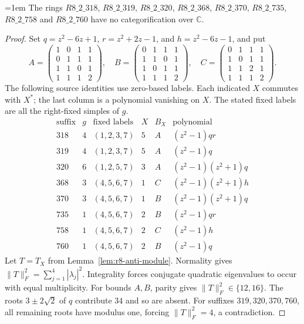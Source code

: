 \begin{proposition}\label{prop:r8-anti-eight}
\emergencystretch=1em
The rings $R8\_2\_318$, $R8\_2\_319$, $R8\_2\_320$,
$R8\_2\_368$, $R8\_2\_370$, $R8\_2\_735$,
$R8\_2\_758$ and $R8\_2\_760$ have no categorification over $\mathbb C$.
\end{proposition}
\begin{proof}
Set $q=z^2-6z+1$, $r=z^2+2z-1$, and $h=z^2-6z-1$, and put
\[
 A=\begin{pmatrix}1&0&1&1\\0&1&1&1\\1&1&0&1\\1&1&1&2\end{pmatrix},\quad
 B=\begin{pmatrix}0&1&1&1\\1&1&0&1\\1&0&1&1\\1&1&1&2\end{pmatrix},\quad
 C=\begin{pmatrix}0&1&1&1\\1&0&1&1\\1&1&2&1\\1&1&1&2\end{pmatrix}.
\]
The following source identities use zero-based labels. Each indicated
$X$ commutes with $X^*$; the last column is a polynomial vanishing on
$X$. The stated fixed labels are all the right-fixed simples of $g$.
\[
\begin{array}{c|c|c|c|c|c}
\text{suffix}&g&\text{fixed labels}&X&B_X&\text{polynomial}\\\hline
318&4&(1,2,3,7)&5&A&(z^2-1)qr\\
319&4&(1,2,3,7)&5&A&(z^2-1)q\\
320&6&(1,2,5,7)&3&A&(z^2-1)(z^2+1)q\\
368&3&(4,5,6,7)&1&C&(z^2-1)(z^2+1)h\\
370&3&(4,5,6,7)&1&B&(z^2-1)(z^2+1)q\\
735&1&(4,5,6,7)&2&B&(z^2-1)qr\\
758&1&(4,5,6,7)&2&C&(z^2-1)h\\
760&1&(4,5,6,7)&2&B&(z^2-1)q
\end{array}
\]
Let $T=T_X$ from Lemma~\ref{lem:r8-anti-module}. Normality gives
$\|T\|_F^2=\sum_{j=1}^4|\lambda_j|^2$. Integrality forces conjugate
quadratic eigenvalues to occur with equal multiplicity.
For bounds $A,B$, parity gives $\|T\|_F^2\in\{12,16\}$.
The roots $3\pm2\sqrt2$ of $q$ contribute $34$ and so are absent.
For suffixes $319,320,370,760$, all remaining roots have modulus one,
forcing $\|T\|_F^2=4$, a contradiction.


\end{proof}
